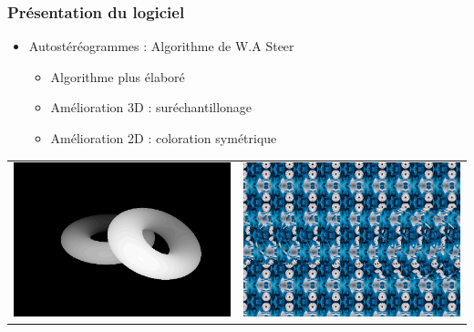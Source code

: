 \documentclass{beamer}
\begin{document}
%
\begin{frame}
\frametitle{Présentation du logiciel}
\begin{itemize}[label=$\bullet$]
	\item Autostéréogrammes : Algorithme de W.A Steer \cite{wasteer}
	\begin{itemize}[label=$\circ$]
	\item Algorithme plus élaboré
	\item Amélioration 3D : suréchantillonage
	\item Amélioration 2D : coloration symétrique
	\end{itemize}
\end{itemize}
\begin{tabular}{l|r}
\includegraphics[scale=0.22]{donutdepth.png}
&
\includegraphics[scale=0.22]{donut2.png}
\end{tabular}

\end{frame}
\end{document}

